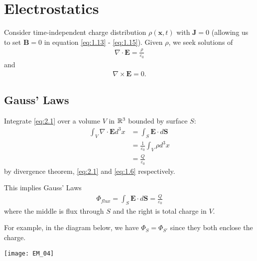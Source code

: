 \documentclass[a4paper]{article}
\begin{document}
\newpage

\section{Electrostatics}

Consider time-independent charge distribution $\rho(\mathbf{x},t)$ with $\mathbf{J}=0$ (allowing us to set $\mathbf{B} = 0$ in equation \eqref{eq:1.13} - \eqref{eq:1.15}). Given $\rho$, we seek solutions of
\begin{equation*}\tag{2.1} \label{eq:2.1}
\begin{aligned}
\nabla \cdot \mathbf{E} = \frac{\rho}{\varepsilon_0}
\end{aligned}
\end{equation*}
and
\begin{equation*}\tag{2.2} \label{eq:2.2}
\begin{aligned}
\nabla \times \mathbf{E} = 0.
\end{aligned}
\end{equation*}

\subsection{Gauss' Laws}
Integrate \eqref{eq:2.1} over a volume $V$ in $\mathbb{R}^3$ bounded by surface $S$:
\begin{equation*}
\begin{aligned}
\int_V \nabla \cdot \mathbf{E} d^3 x &= \int_S \mathbf{E} \cdot d\mathbf{S}\\
&= \frac{1}{\varepsilon_0} \int_V \rho d^3 x\\
&= \frac{Q}{\varepsilon_0}
\end{aligned}
\end{equation*}
by divergence theorem, \eqref{eq:2.1} and \eqref{eq:1.6} respectively.

This implies Gauss' Laws
\begin{equation*}\tag{2.3} \label{eq:2.3}
\begin{aligned}
\Phi_{flux} = \int_S \mathbf{E}\cdot d\mathbf{S} = \frac{Q}{\varepsilon_0}
\end{aligned}
\end{equation*}
where the middle is flux through $S$ and the right is total charge in $V$.

For example, in the diagram below, we have $\Phi_S = \Phi_{S'}$ since they both enclose the charge.

\texttt{[image: EM\_04]}
\end{document}
